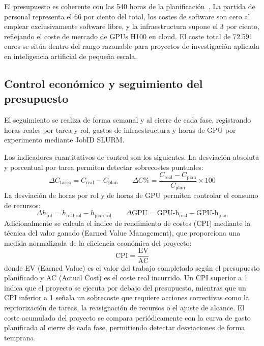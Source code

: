 \noindent El presupuesto es coherente con las 540 horas de la planificación~\cite{gep23e2}. La partida de personal representa el 66 por ciento del total, los costes de software son cero al emplear exclusivamente software libre, y la infraestructura supone el 3 por ciento, reflejando el coste de mercado de GPUs H100 en cloud. El coste total de 72.591 euros se sitúa dentro del rango razonable para proyectos de investigación aplicada en inteligencia artificial de pequeña escala.

\subsection{Control económico y seguimiento del presupuesto}

El seguimiento se realiza de forma semanal y al cierre de cada fase, registrando horas reales por tarea y rol, gastos de infraestructura y horas de GPU por experimento mediante JobID SLURM.

Los indicadores cuantitativos de control son los siguientes. La desviación absoluta y porcentual por tarea permiten detectar sobrecostes puntuales:
\[
\Delta C_{\text{tarea}} = C_{\text{real}} - C_{\text{plan}} \qquad
\Delta C\% = \frac{C_{\text{real}} - C_{\text{plan}}}{C_{\text{plan}}} \times 100
\]
La desviación de horas por rol y de horas de GPU permiten controlar el consumo de recursos:
\[
\Delta h_{\text{rol}} = h_{\text{real,rol}} - h_{\text{plan,rol}} \qquad
\Delta \text{GPU} = \text{GPU-h}_{\text{real}} - \text{GPU-h}_{\text{plan}}
\]
Adicionalmente se calcula el índice de rendimiento de costes (CPI) mediante la técnica del valor ganado (Earned Value Management), que proporciona una medida normalizada de la eficiencia económica del proyecto:
\[
\text{CPI} = \frac{\text{EV}}{\text{AC}}
\]
donde EV (Earned Value) es el valor del trabajo completado según el presupuesto planificado y AC (Actual Cost) es el coste real incurrido. Un CPI superior a 1 indica que el proyecto se ejecuta por debajo del presupuesto, mientras que un CPI inferior a 1 señala un sobrecoste que requiere acciones correctivas como la repriorización de tareas, la reasignación de recursos o el ajuste de alcance. El coste acumulado del proyecto se compara periódicamente con la curva de gasto planificada al cierre de cada fase, permitiendo detectar desviaciones de forma temprana.

